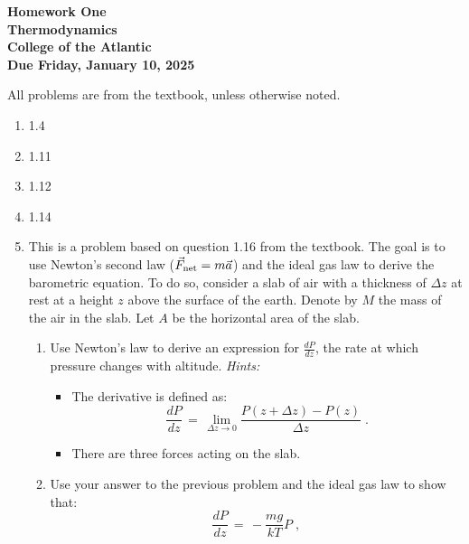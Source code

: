 \documentclass[12pt]{article}
\begin{document}
\pagestyle{empty}
 
\begin{center}
{\LARGE {\bf Homework One}}\\
\bigskip
{\Large {\bf Thermodynamics}}\\
\bigskip
{\Large {\bf College of the Atlantic}}\\
\bigskip
{ {\bf Due Friday, January 10, 2025}}\\ 
\end{center}
\medskip


\noindent All problems are from the textbook, unless otherwise noted. 

\begin{enumerate}
\setlength{\itemsep}{-1mm}
  \item 1.4
  \item 1.11
  \item 1.12
  \item 1.14
  \item This is a problem based on question 1.16 from the textbook.
    The goal is to use Newton's second law ($\vec{F}_{\rm net} =
    m\vec{a}$) and the ideal gas law to derive the barometric
    equation.  To do so, consider a slab of air with a thickness of
    $\Delta z$ at rest at a height $z$ above the surface of the earth.
    Denote by $M$ the mass of the air in the slab.  Let $A$ be the
    horizontal area of the slab.  
    \begin{enumerate}
    \item Use Newton's law to derive an expression for
      $\frac{dP}{dz}$, the rate at which pressure changes with
      altitude.  \emph{Hints:}
      \begin{itemize}
      \item The derivative is defined as:
        \begin{equation}
          \frac{dP}{dz} \, = \, \lim_{\Delta z \rightarrow 0}
          \frac{P(z+\Delta z) - P(z)}{\Delta z} \;.
        \end{equation}
      \item There are three forces acting on the slab.
      \end{itemize}
      \item Use your answer to the previous problem and the ideal gas
        law to show that:
        \begin{equation}
          \frac{dP}{dz} \, = \, -\frac{mg}{kT}P \;,
          \label{eq:barometric}
          \end{equation}

\end{enumerate}
\end{enumerate}
\end{document}
